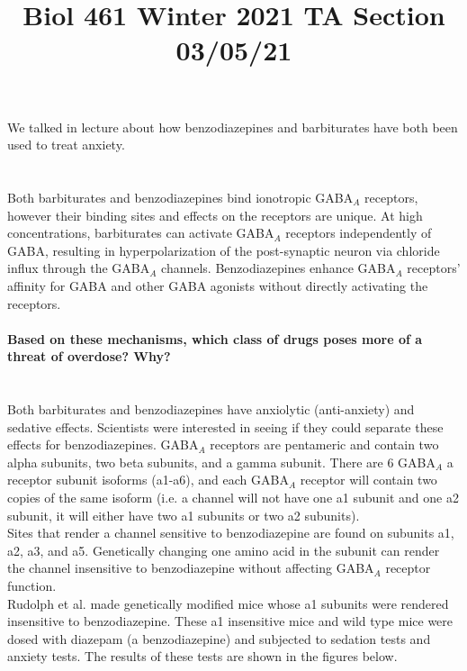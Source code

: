 \documentclass{article}
\title{Biol 461 Winter 2021 TA Section 03/05/21}
\author{}
\date{}
\begin{document}
\FloatBarrier

\maketitle
We talked in lecture about how benzodiazepines and barbiturates have both been used to treat anxiety.
\\
\section{} 
Both barbiturates and benzodiazepines bind ionotropic GABA$_A$ receptors, however their binding sites and effects on the receptors are unique. At high concentrations, barbiturates can activate GABA$_A$ receptors independently of GABA, resulting in hyperpolarization of the post-synaptic neuron via chloride influx through the GABA$_A$ channels. Benzodiazepines enhance GABA$_A$ receptors' affinity for GABA and other GABA agonists without directly activating the receptors.\\
\\
\textbf{Based on these mechanisms, which class of drugs poses more of a threat of overdose? Why?}

\section{}
Both barbiturates and benzodiazepines have anxiolytic (anti-anxiety) and sedative effects. Scientists were interested in seeing if they could separate these effects for benzodiazepines. GABA$_A$ receptors are pentameric and contain two alpha subunits, two beta subunits, and a gamma subunit. There are 6 GABA$_A$ a receptor subunit isoforms (a1-a6), and each GABA$_A$ receptor will contain two copies of the same isoform (i.e. a channel will not have one a1 subunit and one a2 subunit, it will either have two a1 subunits or two a2 subunits).\\
\indent Sites that render a channel sensitive to benzodiazepine are found on subunits a1, a2, a3, and a5. Genetically changing one amino acid in the subunit can render the channel insensitive to benzodiazepine without affecting GABA$_A$ receptor function.\\
\indent Rudolph et al. \cite{rudolph_benzodiazepine_1999} made genetically modified mice whose a1 subunits were rendered insensitive to benzodiazepine. These a1 insensitive mice and wild type mice were dosed with diazepam (a benzodiazepine) and subjected to sedation tests and anxiety tests. The results of these tests are shown in the figures below.
\end{document}
